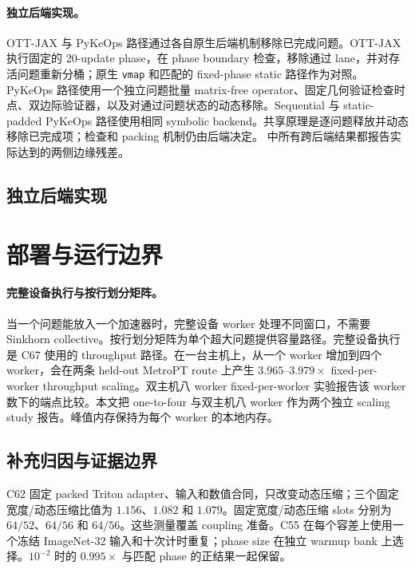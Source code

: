 \paragraph{独立后端实现。}
OTT-JAX 与 PyKeOps 路径通过各自原生后端机制移除已完成问题。OTT-JAX 执行固定的 20-update phase，在 phase boundary 检查，移除通过 lane，并对存活问题重新分桶；原生 \texttt{vmap} 和匹配的 fixed-phase static 路径作为对照。PyKeOps 路径使用一个独立问题批量 matrix-free operator、固定几何验证检查时点、双边际验证器，以及对通过问题状态的动态移除。Sequential 与 static-padded PyKeOps 路径使用相同 symbolic backend。共享原理是逐问题释放并动态移除已完成项；检查和 packing 机制仍由后端决定。 中所有跨后端结果都报告实际达到的两侧边缘残差。

\subsection{独立后端实现}





\section{部署与运行边界}

\paragraph{完整设备执行与按行划分矩阵。}
当一个问题能放入一个加速器时，完整设备 worker 处理不同窗口，不需要 Sinkhorn collective。按行划分矩阵为单个超大问题提供容量路径。完整设备执行是 C67 使用的 throughput 路径。在一台主机上，从一个 worker 增加到四个 worker，会在两条 held-out MetroPT route 上产生 $3.965$--$3.979\times$ fixed-per-worker throughput scaling。双主机八 worker fixed-per-worker 实验报告该 worker 数下的端点比较。本文把 one-to-four 与双主机八 worker 作为两个独立 scaling study 报告。峰值内存保持为每个 worker 的本地内存。

\subsection{补充归因与证据边界}





C62 固定 packed Triton adapter、输入和数值合同，只改变动态压缩；三个固定宽度/动态压缩比值为 $1.156$、$1.082$ 和 $1.079$。固定宽度/动态压缩 slots 分别为 $64/52$、$64/56$ 和 $64/56$。这些测量覆盖 coupling 准备。C55 在每个容差上使用一个冻结 ImageNet-32 输入和十次计时重复；phase size 在独立 warmup bank 上选择。$10^{-2}$ 时的 $0.995\times$ 与匹配 phase 的正结果一起保留。

